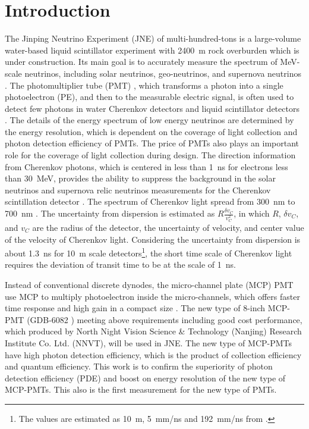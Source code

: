 \section{Introduction}
The Jinping Neutrino Experiment (JNE) of multi-hundred-tons is a large-volume water-based liquid scintillator experiment with \SI{2400}{m} rock overburden \cite{LetterJNE2017} which is under construction. Its main goal is to accurately measure the spectrum of MeV-scale neutrinos, including solar neutrinos, geo-neutrinos, and supernova neutrinos \cite{LetterJNE2017}. %
The photomultiplier tube (PMT) \cite{HAMAMATSUManual}, which transforms a photon into a single photoelectron (PE), and then to the measurable electric signal, is often used to detect few photons in water Cherenkov detectors \cite{SNO,SuperK} and liquid scintillator detectors \cite{KamLAND,JUNO:2015zny}. The details of the energy spectrum of low energy neutrinos are determined by the energy resolution, which is dependent on the coverage of light collection and photon detection efficiency of PMTs. The price of PMTs also plays an important role for the coverage of light collection during design. The direction information from Cherenkov photons, which is centered in less than \SI{1}{ns} for electrons less than \SI{30}{MeV}, provides the ability to suppress the background in the solar neutrinos and supernova relic neutrinos measurements for the Cherenkov scintillation detector \cite{Guo_2019}. The spectrum of Cherenkov light spread from \SI{300}{nm} to \SI{700}{nm} \cite{Luo:2022xrd}. The uncertainty from dispersion is estimated as $R\frac{\delta v_C}{v_C^2}$, in which $R$, $\delta v_C$, and $v_C$ are the radius of the detector, the uncertainty of velocity, and center value of the velocity of Cherenkov light. Considering the uncertainty from dispersion is about \SI{1.3}{ns} for \SI{10}{m} scale detectors\footnote{The values are estimated as \SI{10}{m}, \SI{5}{mm/ns} and \SI{192}{mm/ns} from \cite{Luo:2022xrd}.}, the short time scale of Cherenkov light requires the deviation of transit time to be at the scale of \SI{1}{ns}.

Instead of conventional discrete dynodes, the micro-channel plate (MCP) PMT use MCP to multiply photoelectron inside the micro-channels, which offers faster time response and high gain in a compact size \cite{HAMAMATSUManual}. The new type of 8-inch MCP-PMT (GDB-6082 \cite{GDB-6082}) meeting above requirements including good cost performance, which produced by North Night Vision Science \& Technology (Nanjing) Research Institute Co. Ltd. (NNVT), will be used in JNE. The new type of MCP-PMTs have high photon detection efficiency, which is the product of collection efficiency and quantum efficiency. This work is to confirm the superiority of photon detection efficiency (PDE) and boost on energy resolution of the new type of MCP-PMTs. This also is the first measurement for the new type of PMTs.

